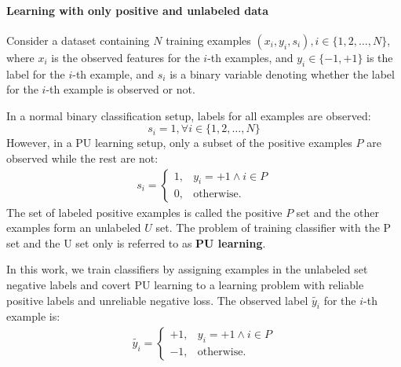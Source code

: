 
\paragraph{Learning with only positive and unlabeled data}
Consider a dataset containing $N$ training examples $(x_i,y_i,s_i), i \in \{1, 2, \dots, N\}$, where $x_i$ is the observed features for the $i$-th examples, and $y_i \in \{-1,+1\}$ is the label for the $i$-th example, and $s_i$ is a binary variable denoting whether the label for the $i$-th example is observed or not.



In a normal binary classification setup, labels for all examples are observed:
\begin{equation}
  s_i=1, \forall i\in\{1,2,\dots,N\}
\end{equation}
However, in a PU learning setup, only a subset of the positive examples $P$ are observed while the rest are not:
\begin{eqnarray}
s_i =
  \begin{cases}
    1, & y_i = +1 \land i\in P\\
    0, & \text{otherwise}.
  \end{cases}
\end{eqnarray}
The set of labeled positive examples is called the positive $P$ set and the other examples form an unlabeled $U$ set.
The problem of training classifier with the P set and the U set only is referred to as \textbf{PU learning}.

In this work, we train classifiers by assigning examples in the unlabeled set negative labels and covert PU learning to a learning problem with reliable positive labels and unreliable negative loss.
The observed label $\tilde{y_i}$ for the $i$-th example is:
\begin{eqnarray}
\tilde{y_i} =
  \begin{cases}
    +1, & y_i = +1 \land i\in P\\
    -1, & \text{otherwise}.
  \end{cases}
\end{eqnarray}

%
